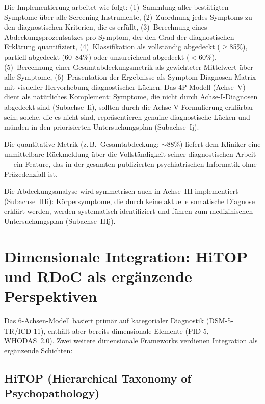 \documentclass[11pt,a4paper]{article}
\begin{document}
Die Implementierung arbeitet wie folgt: (1)~Sammlung aller best\"atigten Symptome \"uber alle Screening-Instrumente, (2)~Zuordnung jedes Symptoms zu den diagnostischen Kriterien, die es erf\"ullt, (3)~Berechnung eines Abdeckungsprozentsatzes pro Symptom, der den Grad der diagnostischen Erkl\"arung quantifiziert, (4)~Klassifikation als vollst\"andig abgedeckt ($\geq$85\%), partiell abgedeckt (60--84\%) oder unzureichend abgedeckt ($<$60\%), (5)~Berechnung einer Gesamtabdeckungsmetrik als gewichteter Mittelwert \"uber alle Symptome, (6)~Pr\"asentation der Ergebnisse als Symptom-Diagnosen-Matrix mit visueller Hervorhebung diagnostischer L\"ucken. Das 4P-Modell (Achse~V) dient als nat\"urliches Komplement: Symptome, die nicht durch Achse-I-Diagnosen abgedeckt sind (Subachse~Ii), sollten durch die Achse-V-Formulierung erkl\"arbar sein; solche, die es nicht sind, repr\"asentieren genuine diagnostische L\"ucken und m\"unden in den priorisierten Untersuchungsplan (Subachse~Ij).

Die quantitative Metrik (z.\,B.\ \glqq Gesamtabdeckung: $\sim$88\%\grqq{}) liefert dem Kliniker eine unmittelbare R\"uckmeldung \"uber die Vollst\"andigkeit seiner diagnostischen Arbeit --- ein Feature, das in der gesamten publizierten psychiatrischen Informatik ohne Pr\"azedenzfall ist.

Die Abdeckungsanalyse wird symmetrisch auch in Achse~III implementiert (Subachse~IIIi): K\"orpersymptome, die durch keine aktuelle somatische Diagnose erkl\"art werden, werden systematisch identifiziert und f\"uhren zum medizinischen Untersuchungsplan (Subachse~IIIj).


\section{Dimensionale Integration: HiTOP und RDoC als erg\"anzende Perspektiven}
\label{sec:dimensional}

Das 6-Achsen-Modell basiert prim\"ar auf kategorialer Diagnostik (DSM-5-TR/ICD-11), enth\"alt aber bereits dimensionale Elemente (PID-5, WHODAS~2.0). Zwei weitere dimensionale Frameworks verdienen Integration als erg\"anzende Schichten:

\subsection{HiTOP (Hierarchical Taxonomy of Psychopathology)}
\end{document}
